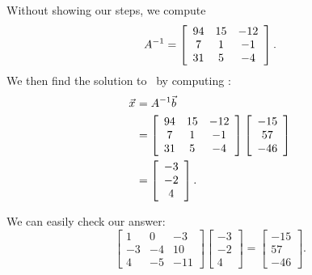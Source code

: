 {Without showing our steps, we compute $$A^{-1} = \left[ \begin {array}{ccc} 94&15&-12\\  7&1&-1
\\  31&5&-4\end {array} \right].$$ We then find the solution to \ttaxb\ by computing \ttai\vb: \begin{align*} \vec{x_{}} &=A^{-1}\vec{b} \\ &= \left[ \begin {array}{ccc} 94&15&-12\\  7&1&-1
\\  31&5&-4\end {array} \right] \left[ \begin {array}{c} -15\\   57 \\  -46\end {array} \right] \\ &= \left[ \begin {array}{c} -3\\   -2\\    4\end {array} \right]. \end{align*}

We can easily check our answer: $$\left[ \begin {array}{ccc} 1&0&-3\\  -3&-4&10
\\  4&-5&-11\end {array} \right]\left[ \begin {array}{c} -3\\   -2\\    4\end {array} \right] = \left[ \begin {array}{c} -15\\   57 \\  -46\end {array} \right].$$
\ }\\ %

